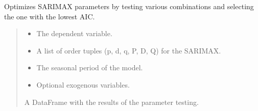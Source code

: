\documentclass[letterpaper,10pt,english]{sphinxmanual}
\begin{document}
\begin{fulllineitems}
\label{\detokenize{docs/time_series_analysis:time_series_analysis.optimize_SARIMAX}}
\pysigstartsignatures
{}
\pysigstopsignatures
\sphinxAtStartPar
Optimizes SARIMAX parameters by testing various combinations and selecting the one with the lowest AIC.
\begin{quote}\begin{description}
\begin{itemize}
\item {} 
\sphinxAtStartPar
{} \textendash{} The dependent variable.

\item {} 
\sphinxAtStartPar
{} \textendash{} A list of order tuples (p, d, q, P, D, Q) for the SARIMAX.

\item {} 
\sphinxAtStartPar
{} \textendash{} The seasonal period of the model.

\item {} 
\sphinxAtStartPar
{} \textendash{} Optional exogenous variables.

\end{itemize}

\sphinxAtStartPar
A DataFrame with the results of the parameter testing.

\end{description}\end{quote}

\end{fulllineitems}

\end{document}
